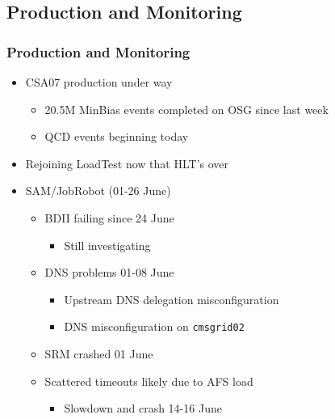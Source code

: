 \documentclass{beamer}
\begin{document}
\subsection{Production and Monitoring}
\begin{frame}
    \frametitle{Production and Monitoring}
    \begin{itemize}
        \item CSA07 production under way
        \begin{itemize}
            \item 20.5M MinBias events completed on OSG since last week
            \item QCD events beginning today
        \end{itemize}
        \item Rejoining LoadTest now that HLT's over
        \item SAM/JobRobot (01-26 June)
        \begin{itemize}
            \item BDII failing since 24 June
            \begin{itemize}
                \item Still investigating
            \end{itemize}
            \item DNS problems 01-08 June
            \begin{itemize}
                \item Upstream DNS delegation misconfiguration
                \item DNS misconfiguration on {\tt cmsgrid02}
            \end{itemize}
            \item SRM crashed 01 June
            \item Scattered timeouts likely due to AFS load
            \begin{itemize}
                \item Slowdown and crash 14-16 June
            \end{itemize}
        \end{itemize}
    \end{itemize}
\end{frame}
\end{document}

